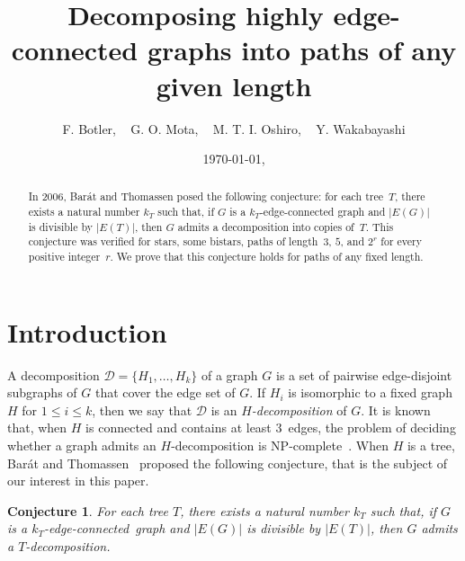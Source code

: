 \documentclass[12pt,reqno,a4paper]{amsart}
\title[Decomposing highly edge-connected graphs into paths of any given length]
{Decomposing highly edge-connected graphs into paths of any given length}
\author[all]{F. Botler, ~ G. O. Mota, ~  M. T. I. Oshiro, ~ Y. Wakabayashi}
\date{\today, \currenttime}
\newtheorem{conjecture}[theorem]{Conjecture}
\newcommand{\D}{\mathcal{D}}
\begin{document}
\begin{abstract}
  In 2006, Barát and Thomassen posed the following conjecture: for
  each tree~\(T\), there exists a natural number \(k_T\) such that, 
  if \(G\) is a \(k_T\)-edge-connected graph and \(|E(G)|\) is
  divisible by \(|E(T)|\), then \(G\) admits a decomposition into copies of~\(T\).  
  This conjecture was verified for stars, some bistars, paths of 
   length~$3$, $5$, and $2^r$ for every positive integer~$r$. 
   We prove that this conjecture holds for 
   paths of any fixed length.
\end{abstract}

\maketitle
\onehalfspacing


\section{Introduction}\label{section:intro}

A decomposition \(\D = \{H_1,\ldots,H_k\}\) of a graph \(G\) is a set 
of pairwise edge-disjoint subgraphs of \(G\) that cover the edge set of \(G\).
If \(H_i\) is isomorphic to a fixed graph \(H\) for \(1\leq i\leq k\), then 
we say that \(\D\) is an
\emph{\(H\)-decomposition} of \(G\).
It is known that, when \(H\) is connected and contains at least
\(3\)~edges, the  problem of deciding whether a graph admits an \(H\)-decomposition is
NP-complete~\cite{DorTarsi97}. 
When $H$ is a tree,
Barát and Thomassen~\cite{BaTh06} proposed the following conjecture,
that is the subject of our interest in this paper.

\begin{conjecture}\label{conj:dec}
  For each tree $T$, there exists a natural number $k_T$ such that, if $G$
  is a \hbox{$k_T$-edge-connected graph} and $|E(G)|$ is divisible by
  $|E(T)|$, then \(G\) admits a \hbox{\(T\)-decomposition.}
\end{conjecture}
\end{document}
